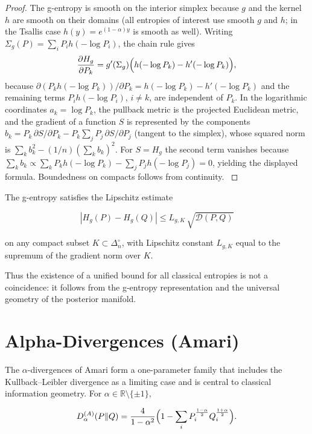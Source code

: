 \begin{proof}
The g-entropy is smooth on the interior simplex because \(g\) and the
kernel \(h\) are smooth on their domains (all entropies of interest use
smooth \(g\) and \(h\); in the Tsallis case \(h(y)=e^{(1-\alpha)y}\)
is smooth as well).  Writing \(\Sigma_g(P)=\sum_i P_i h(-\log P_i)\), the
chain rule gives
\[
\frac{\partial H_g}{\partial P_k}
=
g'(\Sigma_g)\Bigl(h(-\log P_k)-h'(-\log P_k)\Bigr),
\]
because \(\partial(P_k h(-\log P_k))/\partial P_k
= h(-\log P_k)-h'(-\log P_k)\) and the remaining terms
\(P_i h(-\log P_i)\), \(i\neq k\), are independent of \(P_k\).
In the logarithmic coordinates \(a_k=\log P_k\), the pullback metric
is the projected Euclidean metric, and the gradient of a function
\(S\) is represented by the components
\(b_k=P_k\,\partial S/\partial P_k-P_k\sum_j P_j\,\partial S/\partial P_j\)
(tangent to the simplex), whose squared norm is
\(\sum_k b_k^2-(1/n)(\sum_k b_k)^2\).  For \(S=H_g\) the second
term vanishes because \(\sum_k b_k\propto \sum_k P_k h(-\log P_k)
-\sum_j P_j h(-\log P_j)=0\), yielding the displayed formula.
Boundedness on compacts follows from continuity. \(\)
\end{proof}

\begin{corollary}
\label{ch:cor:g-entropy}
The g-entropy satisfies the Lipschitz estimate

\[
|H_g(P)-H_g(Q)|
\le
L_{g,K}\,\sqrt{\mathcal D(P,Q)}
\]

on any compact subset \(K\subset\Delta_n^\circ\), with Lipschitz constant
\(L_{g,K}\) equal to the supremum of the gradient norm over \(K\).
\end{corollary}

Thus the existence of a unified bound for all classical entropies is
not a coincidence: it follows from the g-entropy representation and the
universal geometry of the posterior manifold.
\section{Alpha-Divergences (Amari)}\label{ch:sec:alpha-divergences-amari}

The \(\alpha\)-divergences of Amari \cite{amari2016information} form a one-parameter family that
includes the Kullback--Leibler divergence as a limiting case and is
central to classical information geometry.  For
\(\alpha\in\mathbb R\setminus\{\pm1\}\),

\[
D_\alpha^{(A)}(P\|Q)
=
\frac{4}{1-\alpha^2}
\Bigl(
1-\sum_i P_i^{\frac{1-\alpha}{2}} Q_i^{\frac{1+\alpha}{2}}
\Bigr).
\]

